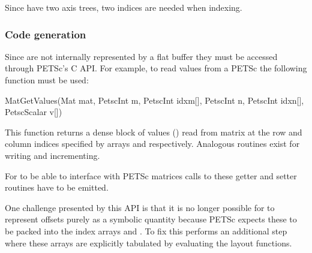 \documentclass[thesis]{subfiles}
\begin{document}
Since  have two axis trees, two indices are needed when indexing.

\subsubsection{Code generation}

Since  are not internally represented by a flat buffer they must be accessed through PETSc's C API.
For example, to read values from a PETSc  the following function must be used:

\begin{cinline}
  MatGetValues(Mat mat,
               PetscInt m, PetscInt idxm[],
               PetscInt n, PetscInt idxn[],
               PetscScalar v[])
\end{cinline}

This function returns a dense block of values () read from matrix  at the row and column indices specified by arrays  and  respectively.
Analogous routines exist for writing and incrementing.

For  to be able to interface with PETSc matrices calls to these getter and setter routines have to be emitted.

One challenge presented by this API is that it is no longer possible for  to represent offsets purely as a symbolic quantity because PETSc expects these to be packed into the index arrays  and .
To fix this  performs an additional step where these arrays are explicitly tabulated by evaluating the layout functions. %
\end{document}
